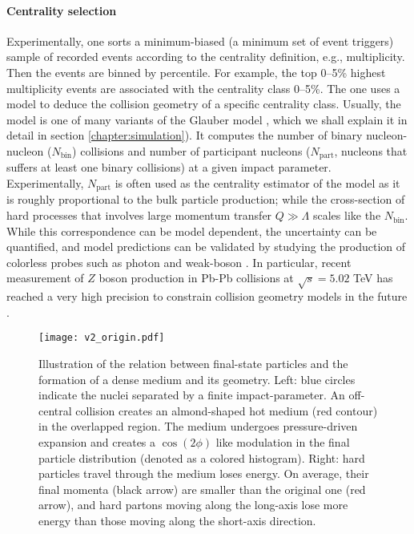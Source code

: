 \paragraph{Centrality selection} Experimentally, one sorts a minimum-biased (a minimum set of event triggers) sample of recorded events according to the centrality definition, e.g., multiplicity. 
Then the events are binned by percentile.
For example,  the top 0--5\% highest multiplicity events are associated with the centrality class 0--5\%. 
The one uses a model to deduce the collision geometry of a specific centrality class.
Usually, the model is one of many variants of the Glauber model \cite{Miller:2007ri}, which we shall explain it in detail in section \ref{chapter:simulation}).
It computes the number of binary nucleon-nucleon ($N_{\textrm{bin}}$) collisions and number of participant nucleons ($N_{\textrm{part}}$, nucleons that suffers at least one binary collisions) at a given impact parameter.
Experimentally, $N_{\textrm{part}}$ is often used as the centrality estimator of the model as it is roughly proportional to the bulk particle production; while the cross-section of hard processes that involves large momentum transfer $Q \gg \Lambda$ scales like the $N_{\textrm{bin}}$.
While this correspondence can be model dependent, the uncertainty can be quantified, and model predictions can be validated by studying the production of colorless probes such as photon and weak-boson \cite{Afanasiev:2012dg,Chatrchyan:2011ua,Aad:2012ew,Aad:2015lcb,Adam:2015lda}.
In particular, recent measurement of $Z$ boson production in Pb-Pb collisions at $\sqrt{s}=5.02$ TeV has reached a very high precision to constrain collision geometry models in the future \cite{ATLAS:2017zkv}.

\begin{figure}
\singlespacing 
\centering
\texttt{[image: v2\_origin.pdf]}
\caption[Illustration of the relation between final state particles and]{Illustration of the relation between final-state particles and the formation of a dense medium and its geometry. Left: blue circles indicate the nuclei separated by a finite impact-parameter. An off-central collision creates an almond-shaped hot medium (red contour) in the overlapped region. The medium undergoes pressure-driven expansion and creates a $\cos(2\phi)$ like modulation in the final particle distribution (denoted as a colored histogram). Right: hard particles travel through the medium loses energy. On average, their final momenta (black arrow) are smaller than the original one (red arrow), and hard partons moving along the long-axis lose more energy than those moving along the short-axis direction.}
\label{fig:v2_demo}
\end{figure}


